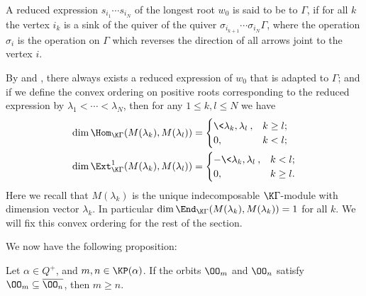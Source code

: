 A reduced expression $s_{i_1}\cdots s_{i_N}$ of the longest
root $w_0$ is said to be  to $\Gamma$, if for all $k$
the vertex $i_k$ is a sink of the quiver of the quiver
$\sigma_{i_{k+1}}\cdots\sigma_{i_N}\Gamma$, where the operation
$\sigma_i$ is the operation on $\Gamma$ which reverses the direction
of all arrows joint to the vertex $i$.

By \cite[Propositions 4.9, 4.12]{L2} and \cite[p59]{Ri},
there always exists a reduced expression of $w_0$
that is adapted to $\Gamma$; and if we define the convex
ordering on positive roots corresponding to the reduced
expression by $\lambda_1<\cdots<\lambda_N$, then for any 
$1\le k,l\le N$ we have 
\[
\begin{aligned}
    \dim\Hom_{\K\Gamma}(M(\lambda_k),M(\lambda_l))& = \begin{cases}
        \<\lambda_k,\lambda_l\>,&k\ge l;\\
        0,&k<l;
    \end{cases}\\
    \dim\Ext^1_{\K\Gamma}(M(\lambda_k),M(\lambda_l))& = \begin{cases}
        -\<\lambda_k,\lambda_l\>,&k<l;\\
        0,&k\ge l.
    \end{cases}
\end{aligned}
\]
Here we recall that $M(\lambda_k)$ is the unique indecomposable $\K\Gamma$-module
with dimension vector $\lambda_k$.
In particular $\dim\End_{\K\Gamma}(M(\lambda_k),M(\lambda_k)) = 1$
for all $k$.
We will fix this convex ordering for the rest of the section.

We now have the following proposition:

\begin{proposition}\label{orbit-and-KP}
    Let $\alpha\in Q^+$, and $m,n\in\KP(\alpha)$.
    If the orbits $\OO_m$ and $\OO_n$ satisfy
    $\OO_m\subseteq\overline{\OO_n}$, then $m\ge n$.
\end{proposition}

